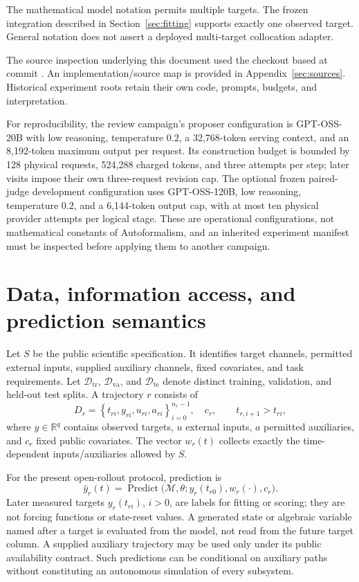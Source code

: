 \documentclass[11pt]{article}
\newcommand{\R}{\mathbb{R}}
\newcommand{\Dtr}{\mathcal{D}_{\mathrm{tr}}}
\newcommand{\Dva}{\mathcal{D}_{\mathrm{va}}}
\newcommand{\Dte}{\mathcal{D}_{\mathrm{te}}}
\newcommand{\M}{\mathcal{M}}
\begin{document}
The mathematical model notation permits multiple targets. The frozen
 integration described in
Section~\ref{sec:fitting} supports exactly one observed target. General notation
does not assert a deployed multi-target collocation adapter.

The source inspection underlying this document used the checkout based at commit
. An implementation/source map is
provided in Appendix~\ref{sec:sources}. Historical experiment roots retain their
own code, prompts, budgets, and interpretation.

For reproducibility, the review campaign's proposer configuration is
GPT-OSS-20B with low reasoning, temperature $0.2$, a 32,768-token serving context,
and an 8,192-token maximum output per request. Its construction budget is bounded
by 128 physical requests, 524,288 charged tokens, and three attempts per step;
later visits impose their own three-request revision cap. The optional frozen
paired-judge development configuration uses GPT-OSS-120B, low reasoning,
temperature $0.2$, and a 6,144-token output cap, with at most ten physical
provider attempts per logical stage. These are operational configurations, not
mathematical constants of Autoformalism, and an inherited experiment manifest
must be inspected before applying them to another campaign.

\section{Data, information access, and prediction semantics}
\label{sec:data}

Let $S$ be the public scientific specification. It identifies target channels,
permitted external inputs, supplied auxiliary channels, fixed covariates, and
task requirements. Let $\Dtr$, $\Dva$, and $\Dte$ denote distinct training,
validation, and held-out test splits. A trajectory $r$ consists of
\begin{equation}
 D_r=\left\{t_{ri},y_{ri},u_{ri},a_{ri}\right\}_{i=0}^{n_r-1},\quad c_r,
 \qquad t_{r,i+1}>t_{ri},
\end{equation}
where $y\in\R^q$ contains observed targets, $u$ external inputs, $a$ permitted
auxiliaries, and $c_r$ fixed public covariates. The vector $w_r(t)$ collects
exactly the time-dependent inputs/auxiliaries allowed by $S$.

For the present open-rollout protocol, prediction is
\begin{equation}
 \widehat y_r(t)=\operatorname{Predict}
 \bigl(\M,\theta;y_r(t_{r0}),w_r(\cdot),c_r\bigr).
 \label{eq:prediction-input}
\end{equation}
Later measured targets $y_r(t_{ri})$, $i>0$, are labels for fitting or scoring;
they are not forcing functions or state-reset values. A generated state or
algebraic variable named after a target is evaluated from the model, not read
from the future target column. A supplied auxiliary trajectory may be used only
under its public availability contract. Such predictions can be conditional on
auxiliary paths without constituting an autonomous simulation of every subsystem.
\end{document}
